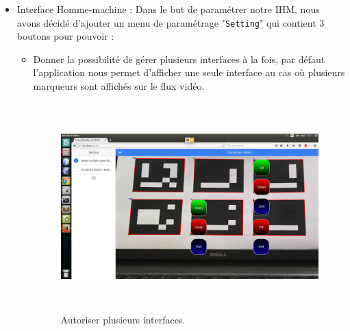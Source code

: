 \documentclass[12pt,a4paper]{article}
\begin{document}
\begin{itemize}

\item Interface Homme-machine :
Dans le but de paramétrer notre IHM, nous avons décidé d'ajouter un menu de paramétrage "\texttt{Setting}" qui contient 3 boutons pour pouvoir :
\begin{itemize}
\item Donner la possibilité de gérer plusieurs interfaces à la fois, par défaut l'application nous permet d'afficher une seule interface au cas où plusieurs marqueurs sont affichés sur le flux vidéo.
\begin{figure}[H]
  \centering
    \includegraphics[width = 11cm,height=8cm]{2.png}
     \caption{Autoriser plusieurs interfaces.}
     \label{ihm2}


\end{figure}
\end{itemize}
\end{itemize}
\end{document}
